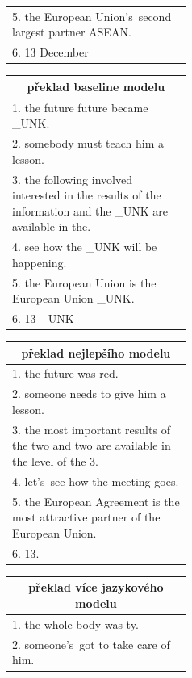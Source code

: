 \begin{table}[H]
\begin{center}
\begin{tabular}{p{0.44\linewidth}}
          5. the European Union's~second largest partner ASEAN. \\
          6. 13 December \\
          \bottomrule
        \end{tabular}
        \hspace{5mm}
        \begin{tabular}{p{0.44\linewidth}}
          \toprule
          \multicolumn{1}{c}{překlad baseline modelu} \\
          \midrule
          1. the future future became \_UNK. \\
          2. somebody must teach him a lesson. \\
          3. the following involved interested in the results of the information and the \_UNK are available in the.\\
          4. see how the \_UNK will be happening. \\
          5. the European Union is the European Union \_UNK. \\
          6. 13 \_UNK \\
          \bottomrule
        \end{tabular}
    \end{center}
    \begin{center}
        \begin{tabular}{p{0.44\linewidth}}
          \toprule
          \multicolumn{1}{c}{překlad nejlepšího modelu} \\
          \midrule
          1. the future was red. \\
          2. someone needs to give him a lesson. \\
          3. the most important results of the two and two are available in the level of the 3. \\
          4. let's~see how the meeting goes. \\
          5. the European Agreement is the most attractive partner of the European Union. \\
          6. 13. \\
          \bottomrule
        \end{tabular}
        \hspace{3mm}
        \begin{tabular}{p{0.44\linewidth}}
          \toprule
          \multicolumn{1}{c}{překlad více jazykového modelu} \\
          \midrule
          1. the whole body was ty. \\
          2. someone's~got to take care of him. \\

\end{tabular}
\end{center}
\end{table}
